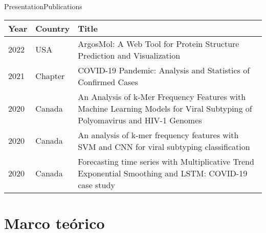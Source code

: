 \documentclass[10pt]{beamer}
\newcommand{\1}{
	\setbeamertemplate{background}{
		\texttt{[image: img/1]}
		\tikz[overlay] \fill[fill opacity=0.75,fill=white] (0,0) rectangle (-\paperwidth,\paperheight);
	}
}
\begin{document}
\begin{frame}{Presentation}{Publications}
	\begin{table}[]
		\setlength{\tabcolsep}{0.5em} %
		{\renewcommand{\arraystretch}{1.4}%
			\begin{tabular}{llp{7cm}}
				\textbf{Year} & \textbf{Country} & \textbf{Title}                                                                                                              \\
				\hline
				2022          &  USA                & ArgosMol: A Web Tool for Protein Structure Prediction and Visualization             \\
				2021          &  Chapter                & COVID-19 Pandemic: Analysis and Statistics of Confirmed Cases             \\
				2020          &  Canada          & An Analysis of k-Mer Frequency Features with Machine Learning Models for Viral Subtyping of Polyomavirus and HIV-1 Genomes                                                        \\
				
				2020          & Canada           & An analysis of k-mer frequency features with SVM and CNN for viral subtyping classification \\
				2020          & Canada           & Forecasting time series with Multiplicative Trend Exponential Smoothing and LSTM: COVID-19 case study                       \\
				
				
			\end{tabular}
		}
	\end{table}
\end{frame}


\section{Marco teórico}
\end{document}
